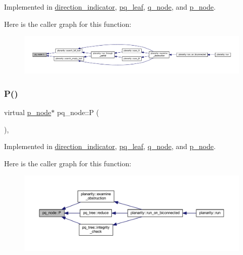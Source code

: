 Implemented in \mbox{\hyperlink{classdirection__indicator_ad05d1484cc0ac57669dfd308ae1fbaa4}{direction\+\_\+indicator}}, \mbox{\hyperlink{classpq__leaf_a0445b0e4084239950416c8643c3fd69d}{pq\+\_\+leaf}}, \mbox{\hyperlink{classq__node_a09ebe5c975ddbf488d2d45b2f75766b2}{q\+\_\+node}}, and \mbox{\hyperlink{classp__node_a350eef32dca1dd9cf8cbb2771b4f3c9b}{p\+\_\+node}}.

Here is the caller graph for this function\+:\nopagebreak
\begin{figure}[H]
\begin{center}
\leavevmode
\includegraphics[width=350pt]{classpq__node_a805b6ef48c847380b47c8ba882ed4ee2_icgraph}
\end{center}
\end{figure}
\mbox{\label{classpq__node_a72178a268ee1ece3ac106ac5fea3b12c}} 
\subsubsection{\texorpdfstring{P()}{P()}}
{\footnotesize\ttfamily virtual \mbox{\hyperlink{classp__node}{p\+\_\+node}}$\ast$ pq\+\_\+node\+::P (\begin{DoxyParamCaption}{ }\end{DoxyParamCaption})\hspace{0.3cm}{\ttfamily [protected]}, {}}



Implemented in \mbox{\hyperlink{classdirection__indicator_a505a48437200ab98e8165912fd1d40bf}{direction\+\_\+indicator}}, \mbox{\hyperlink{classpq__leaf_a26b5bc998de77c10430b9406ed06f2ce}{pq\+\_\+leaf}}, \mbox{\hyperlink{classq__node_ad325a1b15488d28a16a634a4de733618}{q\+\_\+node}}, and \mbox{\hyperlink{classp__node_a4d8d7a171935a008f0718275dede2b43}{p\+\_\+node}}.

Here is the caller graph for this function\+:\nopagebreak
\begin{figure}[H]
\begin{center}
\leavevmode
\includegraphics[width=350pt]{classpq__node_a72178a268ee1ece3ac106ac5fea3b12c_icgraph}
\end{center}
\end{figure}
\mbox{\label{classpq__node_aa6830ab47a280f41fe61b7d2f8b508bb}} 
